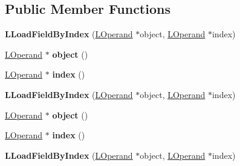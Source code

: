 \subsection*{Public Member Functions}
\begin{DoxyCompactItemize}
\item 
{\bfseries L\+Load\+Field\+By\+Index} (\hyperlink{classv8_1_1internal_1_1_l_operand}{L\+Operand} $\ast$object, \hyperlink{classv8_1_1internal_1_1_l_operand}{L\+Operand} $\ast$index)\hypertarget{classv8_1_1internal_1_1_l_load_field_by_index_ab34ee5ac7fc755b38574c2e4ddf48cbb}{}\label{classv8_1_1internal_1_1_l_load_field_by_index_ab34ee5ac7fc755b38574c2e4ddf48cbb}

\item 
\hyperlink{classv8_1_1internal_1_1_l_operand}{L\+Operand} $\ast$ {\bfseries object} ()\hypertarget{classv8_1_1internal_1_1_l_load_field_by_index_a60238cb7f0566a0951b1f1f0ec12d174}{}\label{classv8_1_1internal_1_1_l_load_field_by_index_a60238cb7f0566a0951b1f1f0ec12d174}

\item 
\hyperlink{classv8_1_1internal_1_1_l_operand}{L\+Operand} $\ast$ {\bfseries index} ()\hypertarget{classv8_1_1internal_1_1_l_load_field_by_index_af40916d3187d009ee7f5df5189d321ca}{}\label{classv8_1_1internal_1_1_l_load_field_by_index_af40916d3187d009ee7f5df5189d321ca}

\item 
{\bfseries L\+Load\+Field\+By\+Index} (\hyperlink{classv8_1_1internal_1_1_l_operand}{L\+Operand} $\ast$object, \hyperlink{classv8_1_1internal_1_1_l_operand}{L\+Operand} $\ast$index)\hypertarget{classv8_1_1internal_1_1_l_load_field_by_index_ab34ee5ac7fc755b38574c2e4ddf48cbb}{}\label{classv8_1_1internal_1_1_l_load_field_by_index_ab34ee5ac7fc755b38574c2e4ddf48cbb}

\item 
\hyperlink{classv8_1_1internal_1_1_l_operand}{L\+Operand} $\ast$ {\bfseries object} ()\hypertarget{classv8_1_1internal_1_1_l_load_field_by_index_a60238cb7f0566a0951b1f1f0ec12d174}{}\label{classv8_1_1internal_1_1_l_load_field_by_index_a60238cb7f0566a0951b1f1f0ec12d174}

\item 
\hyperlink{classv8_1_1internal_1_1_l_operand}{L\+Operand} $\ast$ {\bfseries index} ()\hypertarget{classv8_1_1internal_1_1_l_load_field_by_index_af40916d3187d009ee7f5df5189d321ca}{}\label{classv8_1_1internal_1_1_l_load_field_by_index_af40916d3187d009ee7f5df5189d321ca}

\item 
{\bfseries L\+Load\+Field\+By\+Index} (\hyperlink{classv8_1_1internal_1_1_l_operand}{L\+Operand} $\ast$object, \hyperlink{classv8_1_1internal_1_1_l_operand}{L\+Operand} $\ast$index)\hypertarget{classv8_1_1internal_1_1_l_load_field_by_index_ab34ee5ac7fc755b38574c2e4ddf48cbb}{}\label{classv8_1_1internal_1_1_l_load_field_by_index_ab34ee5ac7fc755b38574c2e4ddf48cbb}


\end{DoxyCompactItemize}
